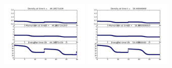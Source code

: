 \documentclass[11pt]{article}
\begin{document}
\vskip 10pt 
\includegraphics[width=0.316666666667\textwidth]{frame0069fig1.png}
\vskip 10pt 
\includegraphics[width=0.316666666667\textwidth]{frame0070fig1.png}
\end{document}
